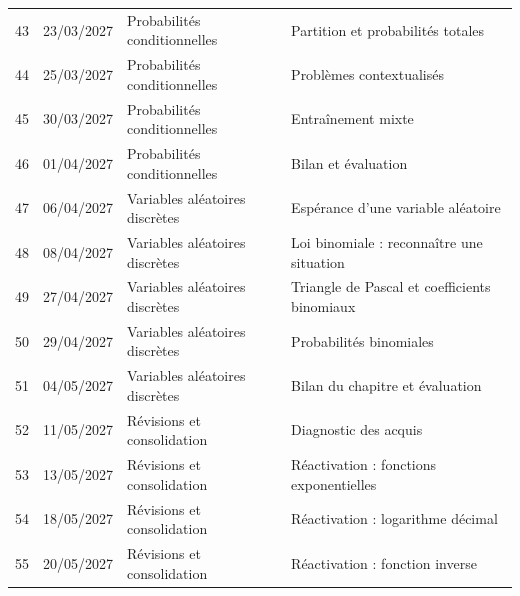 \begin{longtable}{cclp{}}
43 & 23/03/2027 & Probabilités conditionnelles & Partition et probabilités totales\\
44 & 25/03/2027 & Probabilités conditionnelles & Problèmes contextualisés\\
45 & 30/03/2027 & Probabilités conditionnelles & Entraînement mixte\\
46 & 01/04/2027 & Probabilités conditionnelles & Bilan et évaluation\\
47 & 06/04/2027 & Variables aléatoires discrètes & Espérance d'une variable aléatoire\\
48 & 08/04/2027 & Variables aléatoires discrètes & Loi binomiale : reconnaître une situation\\
49 & 27/04/2027 & Variables aléatoires discrètes & Triangle de Pascal et coefficients binomiaux\\
50 & 29/04/2027 & Variables aléatoires discrètes & Probabilités binomiales\\
51 & 04/05/2027 & Variables aléatoires discrètes & Bilan du chapitre et évaluation\\
52 & 11/05/2027 & Révisions et consolidation & Diagnostic des acquis\\
53 & 13/05/2027 & Révisions et consolidation & Réactivation : fonctions exponentielles\\
54 & 18/05/2027 & Révisions et consolidation & Réactivation : logarithme décimal\\
55 & 20/05/2027 & Révisions et consolidation & Réactivation : fonction inverse\\
\bottomrule
\end{longtable}
\normalsize
